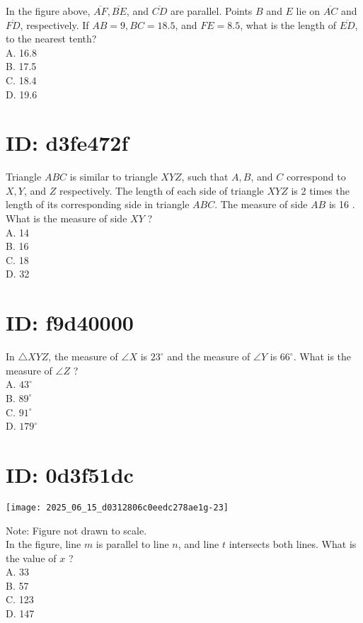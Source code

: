 In the figure above, $\overline{A F}, \overline{B E}$, and $\overline{C D}$ are parallel. Points $B$ and $E$ lie on $\overline{A C}$ and $\overline{F D}$, respectively. If $A B=9, B C=18.5$, and $F E=8.5$, what is the length of $\overline{E D}$, to the nearest tenth?\\
A. 16.8\\
B. 17.5\\
C. 18.4\\
D. 19.6


















\section*{ID: d3fe472f}
Triangle $A B C$ is similar to triangle $X Y Z$, such that $A, B$, and $C$ correspond to $X, Y$, and $Z$ respectively. The length of each side of triangle $X Y Z$ is 2 times the length of its corresponding side in triangle $A B C$. The measure of side $A B$ is 16 . What is the measure of side $X Y$ ?\\
A. 14\\
B. 16\\
C. 18\\
D. 32

\section*{ID: f9d40000}
In $\triangle X Y Z$, the measure of $\angle X$ is $23^{\circ}$ and the measure of $\angle Y$ is $66^{\circ}$. What is the measure of $\angle Z$ ?\\
A. $43^{\circ}$\\
B. $89^{\circ}$\\
C. $91^{\circ}$\\
D. $179^{\circ}$

\section*{ID: 0d3f51dc}
\begin{center}
\texttt{[image: 2025\_06\_15\_d0312806c0eedc278ae1g-23]}
\end{center}

Note: Figure not drawn to scale.\\
In the figure, line $m$ is parallel to line $n$, and line $t$ intersects both lines. What is the value of $x$ ?\\
A. 33\\
B. 57\\
C. 123\\
D. 147

